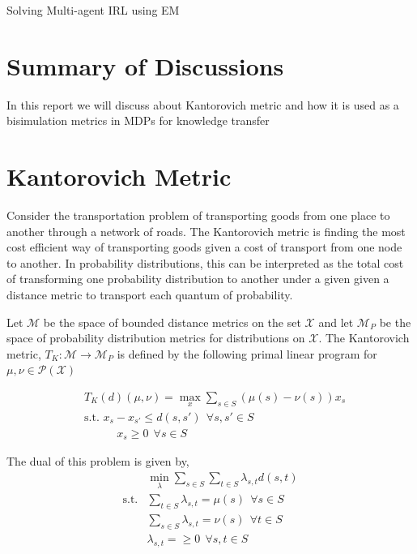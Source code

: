 \documentclass{article}[11pt]
\begin{document}
\begin{center}
Solving Multi-agent IRL using EM
\end{center}

\section{Summary of Discussions}
In this report we will discuss about Kantorovich metric and how it is used  as a bisimulation metrics in MDPs for knowledge transfer



\section{Kantorovich Metric}

Consider the transportation problem of transporting goods from one place to another through a network of roads. The Kantorovich metric is finding the most cost efficient way of transporting goods given a cost of transport from one node to another. In probability distributions, this can be interpreted as the total cost of transforming one probability distribution to another under a given given a distance metric to transport each quantum of probability.

Let $\mathcal{M}$ be the space of bounded distance metrics on the set $\mathcal{X}$ and let $\mathcal{M}_P$ be the space of probability distribution metrics for distributions on $\mathcal{X}$. The Kantorovich metric, $T_K : \mathcal{M} \to \mathcal{M}_P$ is defined by the following primal linear program for $\mu, \nu \in \mathcal{P}(\mathcal{X})$

\begin{align*}
&T_K(d) (\mu,\nu) = \max_x \sum_{s \in S} (\mu(s) - \nu(s))x_s\\
&\text{s.t.   } x_s-x_{s'} \le d(s,s') \ \ \forall s,s' \in S\\
&\ \ \ \ \ \ \ \ \ \ \ \ \ x_s \ge 0 \ \ \forall s \in S
\end{align*}

The dual of this problem is given by,
\begin{align*}
&\min_\lambda \sum_{s \in S}\sum_{t \in S} \lambda_{s,t}d(s,t)\\
\text{s.t.} & \sum_{t\in S}\lambda_{s,t} = \mu(s) \ \ \forall s \in S\\
& \sum_{s\in S}\lambda_{s,t} = \nu(s) \ \ \forall t \in S\\
&\lambda_{s,t} = \ge 0 \ \ \forall s,t \in S
\end{align*}
\end{document}

